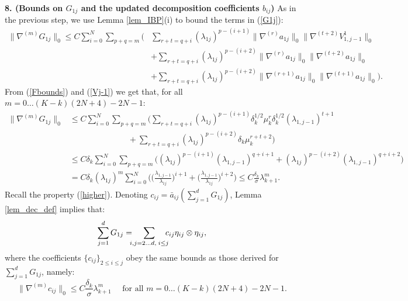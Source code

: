 \documentclass[reqno,twoside,11pt]{amsart}
\numberwithin{equation}{section}
\theoremstyle{plain}
\theoremstyle{definition}
\begin{document}
{\bf 8. (Bounds on $G_{1j}$ and the updated decomposition coefficients $b_{ij}$)} 
As in the previous step, we use Lemma \ref{lem_IBP}(i) to bound the terms in (\ref{G1j}):
\begin{equation*}
\begin{split}
\|\nabla^{(m)} G_{1j}\|_0 \leq C \sum_{i=0}^N \sum_{p+q=m}\Big(&\sum_{r+t=q+i}
(\lambda_{1j})^{p-(i+1)} \|\nabla^{(r)}a_{1j}\|_0\|\nabla^{(t+2)}V_{1,{j-1}}^1\|_0  \\ &
+ \sum_{r+t=q+i}
(\lambda_{1j})^{p-(i+2)}  \|\nabla^{(r)}a_{1j}\|_0\|\nabla^{(t+2)} a_{1j}\|_0 \\ & 
+ \sum_{r+t=q+i} (\lambda_{1j})^{p-(i+2)}  
\|\nabla^{(r+1)} a_{1j}\|_0\| \nabla^{(t+1)} a_{1j}\|_0 \Big).
\end{split}
\end{equation*}
From (\ref{Fbounds}) and (\ref{Vj-1}) we get that, for all $m=0\ldots (K-k)(2N+4)-2N-1$:
\begin{equation*}
\begin{split}
\|\nabla^{(m)} G_{1j}\|_0 & \leq C \sum_{i=0}^N \sum_{p+q=m}\Big(\sum_{r+t=q+i}
(\lambda_{1j})^{p-(i+1)} \delta_k^{1/2}\mu_k^r\delta_k^{1/2}
(\lambda_{1,j-1})^{t+1}\\ & \hspace{3cm} + \sum_{r+t=q+i}
(\lambda_{1j})^{p-(i+2)} \delta_k\mu_k^{r+t+2} \Big) \\ & \leq
C\delta_k \sum_{i=0}^N \sum_{p+q=m}\Big( (\lambda_{1j})^{p-(i+1)}(\lambda_{1,j-1})^{q+i+1}
+ (\lambda_{1j})^{p-(i+2)}(\lambda_{1,j-1})^{q+i+2}\Big) \\ &
= C\delta_k (\lambda_{1j})^m \sum_{i=0}^N \Big(\big(\frac{\lambda_{1,j-1}}{\lambda_{1j}}\big)^{i+1}
+ \big(\frac{\lambda_{1,j-1}}{\lambda_{1j}}\big)^{i+2}\Big) 
\leq C\frac{\delta_k}{\sigma}\lambda_{k+1}^{m}.
\end{split}
\end{equation*}
Recall the property (\ref{higher}). Denoting $c_{ij} = \bar a_{ij} (\sum_{j=1}^d G_{1j} )$,
Lemma \ref{lem_dec_def} implies that:
\begin{equation}\label{c_deco}
\sum_{j=1}^d G_{1j} = \hspace{-2mm} \sum_{i,j=2\ldots d,\; i\leq j}
\hspace{-2mm} c_{ij} \eta_{ij}\otimes\eta_{ij},
\end{equation}
where the coefficients $\{c_{ij}\}_{2\leq i\leq j}$ obey the same
bounds as those derived for $\sum_{j=1}^{d}G_{1j}$, namely: 
\begin{equation}\label{c_bd}
\|\nabla^{(m)} c_{ij}\|_0 \leq
C\frac{\delta_k}{\sigma}\lambda_{k+1}^{m} \quad\mbox{ for all } m
=0\ldots (K-k)(2N+4)-2N-1.
\end{equation}
\end{document}
